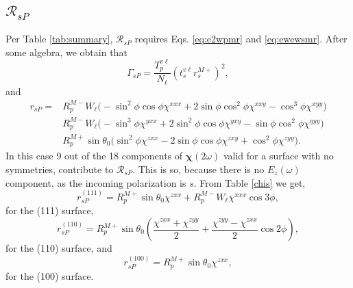 

\subsection{\texorpdfstring{$\mathcal{R}_{sP}$}{RsP}}\label{sec:RsP}

Per Table \ref{tab:summary}, $\mathcal{R}_{sP}$ requires Eqs. \eqref{eq:e2wpmr} and \eqref{eq:ewewsmr}. After some algebra, we obtain that
\begin{equation}\label{mcv4}
\Gamma_{sP}=
\frac{T^{v\ell}_{p}}{N_{\ell}}
\left(t^{v\ell}_{s}r^{M+}_{s}\right)^{2},
\end{equation}
and
\begin{equation}
\begin{split}
r_{sP} = 
& R^{M-}_{p}W_{\ell}
\big(
- \sin^{2}\phi\cos\phi\chi^{xxx}
+ 2\sin\phi\cos^{2}\phi\chi^{xxy}
- \cos^{3}\phi\chi^{xyy}
\big)\\
& R^{M-}_{p}W_{\ell}
\big(
- \sin^{3}\phi\chi^{yxx}
+ 2\sin^{2}\phi\cos\phi\chi^{yxy}
- \sin\phi\cos^{2}\phi\chi^{yyy}
\big)\\
& R^{M+}_{p}\sin\theta_{0}
\big(
  \sin^{2}\phi\chi^{zxx}
- 2\sin\phi\cos\phi\chi^{zxy}
+ \cos^{2}\phi\chi^{zyy}
\big).
\end{split}
\end{equation}
In this case 9 out of the 18 components of $\boldsymbol{\chi}(2\omega)$ valid for a surface with no symmetries, contribute to $\mathcal{R}_{sP}$. This is so, because there is no $E_z(\omega)$ component, as the incoming polarization is $s$. From Table \ref{chis} we get,
\begin{equation}
r^{(111)}_{sP} = 
R^{M+}_{p}\sin\theta_{0}\chi^{zxx} +
R^{M-}_{p}W_{\ell}\chi^{xxx}\cos3\phi,
\end{equation}
for the (111) surface,
\begin{equation}
r^{(110)}_{sP} = 
R^{M+}_{p}\sin\theta_{0}
\left(
\frac{\chi^{zxx} + \chi^{zyy}}{2} + \frac{\chi^{zyy} - \chi^{zxx}}{2}\cos2\phi
\right),
\end{equation}
for the (110) surface, and
\begin{equation}
r^{(100)}_{sP} = R^{M+}_{p}\sin\theta_{0}\chi^{zxx},
\end{equation}
for the (100) surface.



